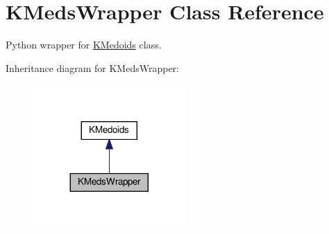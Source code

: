 \hypertarget{classKMedsWrapper}{}\section{K\+Meds\+Wrapper Class Reference}
\label{classKMedsWrapper}


Python wrapper for \hyperlink{classKMedoids}{K\+Medoids} class.  




Inheritance diagram for K\+Meds\+Wrapper\+:\nopagebreak
\begin{figure}[H]
\begin{center}
\leavevmode
\includegraphics[width=164pt]{classKMedsWrapper__inherit__graph}
\end{center}
\end{figure}
